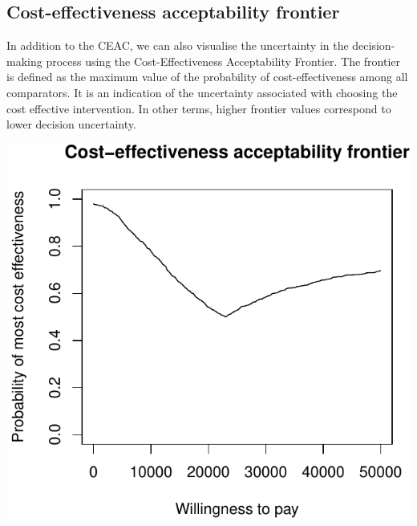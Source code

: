 \documentclass[]{article}
\newenvironment{Shaded}{\begin{snugshade}}{\end{snugshade}}
\newcommand{\ControlFlowTok}[1]{\textcolor[rgb]{0.13,0.29,0.53}{\textbf{#1}}}
\newcommand{\DataTypeTok}[1]{\textcolor[rgb]{0.13,0.29,0.53}{#1}}
\newcommand{\DecValTok}[1]{\textcolor[rgb]{0.00,0.00,0.81}{#1}}
\newcommand{\KeywordTok}[1]{\textcolor[rgb]{0.13,0.29,0.53}{\textbf{#1}}}
\newcommand{\NormalTok}[1]{#1}
\newcommand{\OperatorTok}[1]{\textcolor[rgb]{0.81,0.36,0.00}{\textbf{#1}}}
\newcommand{\OtherTok}[1]{\textcolor[rgb]{0.56,0.35,0.01}{#1}}
\newcommand{\StringTok}[1]{\textcolor[rgb]{0.31,0.60,0.02}{#1}}
\begin{document}
\hypertarget{cost-effectiveness-acceptability-frontier}{%
\subsection{Cost-effectiveness acceptability
frontier}\label{cost-effectiveness-acceptability-frontier}}

In addition to the CEAC, we can also visualise the uncertainty in the
decision-making process using the Cost-Effectiveness Acceptability
Frontier. The frontier is defined as the maximum value of the
probability of cost-effectiveness among all comparators. It is an
indication of the uncertainty associated with choosing the cost
effective intervention. In other terms, higher frontier values
correspond to lower decision uncertainty.

\begin{Shaded}
\end{Shaded}

\begin{center}\includegraphics{report_files/figure-latex/unnamed-chunk-6-1} \end{center}
\end{document}
